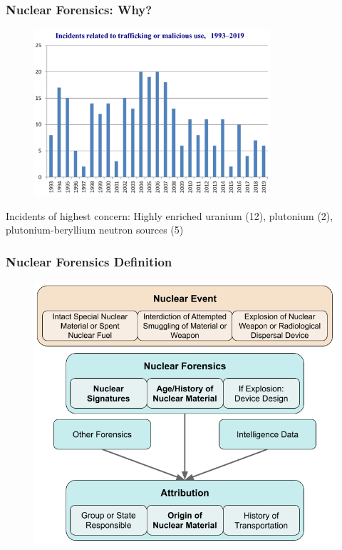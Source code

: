 
\begin{frame}
  \frametitle{Nuclear Forensics: Why?}
  \begin{figure}
    \centering
    \includegraphics[width=0.78\textwidth]{./figures/nucleartrafficking.png}
  \end{figure}
  Incidents of highest concern: Highly enriched uranium (12), plutonium (2), 
  plutonium-beryllium neutron sources (5) \cite{itdb}
\end{frame}

\begin{frame}
  \frametitle{Nuclear Forensics Definition}
  \vspace{-8pt}
  \begin{figure}
    \centering
    \includegraphics[height=0.9\textheight]{./figures/nf_define.png}
  \end{figure}
\end{frame}

